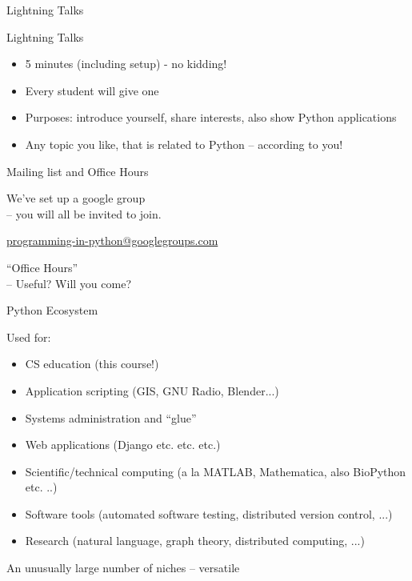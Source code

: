 \documentclass{beamer}
\begin{document}
\begin{frame}{Lightning Talks}

{\Large Lightning Talks}
\begin{itemize}
   \item 5 minutes (including setup) - no kidding!
   \item Every student will give one
   \item Purposes: introduce yourself, share interests, also show Python applications
   \item Any topic you like, that is related to Python -- according to you!
\end{itemize}
\end{frame}


\begin{frame}{Mailing list and Office Hours}

\vfill
{\Large We've set up a google group\\
 -- you will all be invited to join.}

\url{programming-in-python@googlegroups.com}

\vfill
{\Large ``Office Hours'' \\
-- Useful? Will you come?}

\vfill

\end{frame}




\begin{frame}{Python Ecosystem}

{\Large Used for:} 
\begin{itemize}
  \item CS education (this course!)  
  \item Application scripting (GIS, GNU Radio, Blender...)
  \item Systems administration and ``glue''
  \item Web applications (Django etc. etc. etc.)
  \item Scientific/technical computing (a la MATLAB, Mathematica, also BioPython etc. ..)
  \item Software tools (automated software testing, distributed version control, ...)
  \item Research (natural language, graph theory, distributed computing, ...)
\end{itemize}

 An unusually large number of niches -- versatile
\end{frame}
\end{document}
